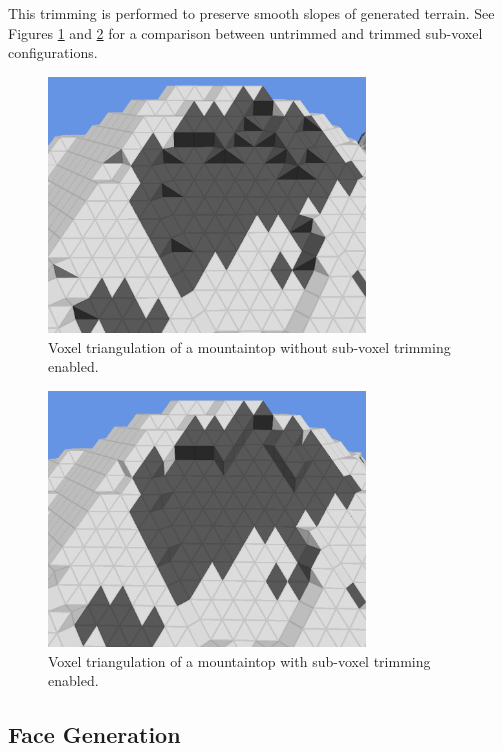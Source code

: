 This trimming is performed to preserve smooth slopes of generated terrain.
See Figures \ref{fig:trimcomparison1} and \ref{fig:trimcomparison2} for a comparison between untrimmed and trimmed sub-voxel configurations.

\begin{figure}
	\centering
		\includegraphics[width=0.75\textwidth]{figures/trimcomparison1.png}
	\caption{
		Voxel triangulation of a mountaintop without sub-voxel trimming enabled.
	}
	\label{fig:trimcomparison1}
\end{figure}

\begin{figure}
	\centering
		\includegraphics[width=0.75\textwidth]{figures/trimcomparison2.png}
	\caption{
		Voxel triangulation of a mountaintop with sub-voxel trimming enabled.
	}
	\label{fig:trimcomparison2}
\end{figure}

\subsection{Face Generation}

